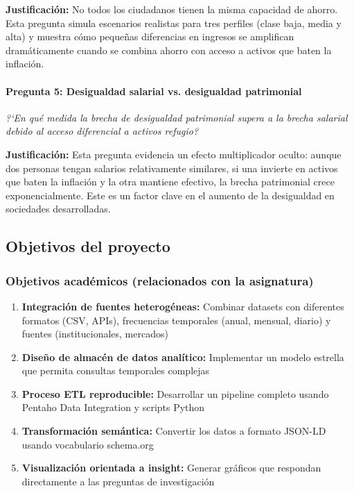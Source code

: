 \documentclass{article}
\begin{document}
\textbf{Justificaci\'on:} No todos los ciudadanos tienen la misma capacidad de ahorro. Esta pregunta simula escenarios realistas para tres perfiles (clase baja, media y alta) y muestra c\'omo peque\~nas diferencias en ingresos se amplifican dram\'aticamente cuando se combina ahorro con acceso a activos que baten la inflaci\'on.

\paragraph{Pregunta 5: Desigualdad salarial vs. desigualdad patrimonial}
\textit{?`En qu\'e medida la brecha de desigualdad patrimonial supera a la brecha salarial debido al acceso diferencial a activos refugio?}

\textbf{Justificaci\'on:} Esta pregunta evidencia un efecto multiplicador oculto: aunque dos personas tengan salarios relativamente similares, si una invierte en activos que baten la inflaci\'on y la otra mantiene efectivo, la brecha patrimonial crece exponencialmente. Este es un factor clave en el aumento de la desigualdad en sociedades desarrolladas.

\subsection{Objetivos del proyecto}

\subsubsection{Objetivos acad\'emicos (relacionados con la asignatura)}

\begin{enumerate}
    \item \textbf{Integraci\'on de fuentes heterog\'eneas:} Combinar datasets con diferentes formatos (CSV, APIs), frecuencias temporales (anual, mensual, diario) y fuentes (institucionales, mercados)
    \item \textbf{Dise\~no de almac\'en de datos anal\'itico:} Implementar un modelo estrella que permita consultas temporales complejas
    \item \textbf{Proceso ETL reproducible:} Desarrollar un pipeline completo usando Pentaho Data Integration y scripts Python
    \item \textbf{Transformaci\'on sem\'antica:} Convertir los datos a formato JSON-LD usando vocabulario schema.org
    \item \textbf{Visualizaci\'on orientada a insight:} Generar gr\'aficos que respondan directamente a las preguntas de investigaci\'on
\end{enumerate}
\end{document}
